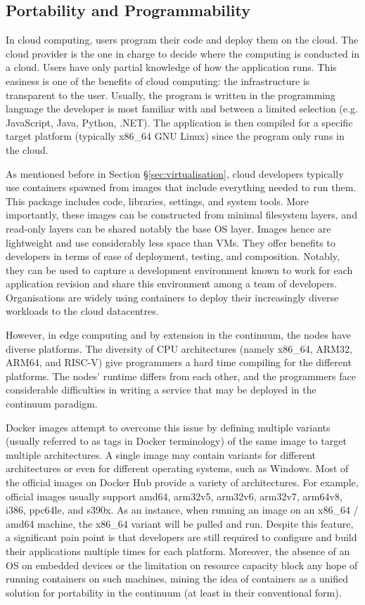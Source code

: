\subsection{Portability and Programmability}

In cloud computing, users program their code and deploy them on the cloud. The cloud provider is the one in charge to decide where the computing is conducted in a cloud. Users have only partial knowledge of how the application runs. This easiness is one of the benefits of cloud computing: the infrastructure is transparent to the user. Usually, the program is written in the programming language the developer is most familiar with and between a limited selection (e.g. JavaScript, Java, Python, .NET). The application is then compiled for a specific target platform (typically x86\_64 GNU Linux) since the program only runs in the cloud.

As mentioned before in Section §\ref{sec:virtualisation}, cloud developers typically use containers spawned from images that include everything needed to run them. This package includes code, libraries, settings, and system tools. More importantly, these images can be constructed from minimal filesystem layers, and read-only layers can be shared notably the base OS layer. Images hence are lightweight and use considerably less space than VMs. They offer benefits to developers in terms of ease of deployment, testing, and composition. Notably, they can be used to capture a development environment known to work for each application revision and share this environment among a team of developers. Organisations are widely using containers to deploy their increasingly diverse workloads to the cloud datacentres.

However, in edge computing and by extension in the continuum, the nodes have diverse platforms. The diversity of CPU architectures (namely x86\_64, ARM32, ARM64, and RISC-V) give programmers a hard time compiling for the different platforms. The nodes' runtime differs from each other, and the programmers face considerable difficulties in writing a service that may be deployed in the continuum paradigm.

Docker images attempt to overcome this issue by defining multiple variants (usually referred to as tags in Docker terminology) of the same image to target multiple architectures. A single image may contain variants for different architectures or even for different operating systems, such as Windows. Most of the official images on Docker Hub \cite{docker-hub} provide a variety of architectures. For example, official images usually support amd64, arm32v5, arm32v6, arm32v7, arm64v8, i386, ppc64le, and s390x. As an instance, when running an image on an x86\_64 / amd64 machine, the x86\_64 variant will be pulled and run. Despite this feature, a significant pain point is that developers are still required to configure and build their applications multiple times for each platform. Moreover, the absence of an OS on embedded devices or the limitation on resource capacity block any hope of running containers on such machines, mining the idea of containers as a unified solution for portability in the continuum (at least in their conventional form).

